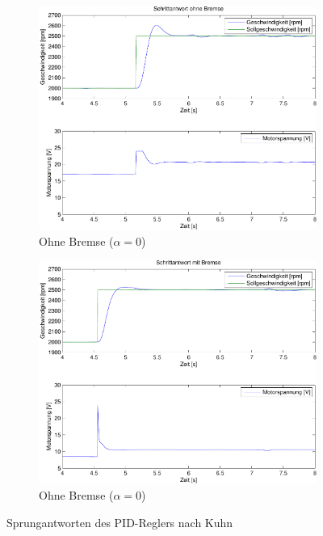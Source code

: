 \begin{figure}[h!]
	\centering
	\begin{subfigure}{0.475\textwidth}
		\includegraphics[width=1\textwidth]{09/step_noload.pdf}
		\caption{Ohne Bremse ($\alpha = 0$)}
	\end{subfigure}
	\hfill{}
	\begin{subfigure}{0.475\textwidth}
		\includegraphics[width=1\textwidth]{09/step_load.pdf}
		\caption{Ohne Bremse ($\alpha = 0$)}
	\end{subfigure}
	\caption{Sprungantworten des PID-Reglers nach Kuhn}
\end{figure}


